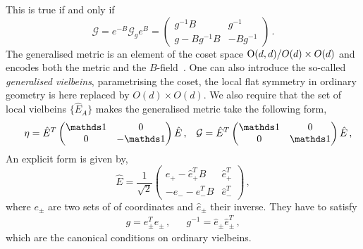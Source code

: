 \documentclass[debug]{phd}
\begin{document}
						This is true if and only if
								\begin{equation}\label{genmet}
									\mathcal{G}= e^{-B} \mathcal{G}_g e^{B} = \begin{pmatrix} g^{-1}B & g^{-1} \\
																g - B g^{-1} B & -B g^{-1} \end{pmatrix}\, .
								\end{equation}
						The generalised metric is an element of the coset space $\mathrm{O}(d,d)/O(d) \times O(d)$ and encodes both the metric and the $B$-field~\cite{petrini3}.
						One can also introduce the so-called \emph{generalised vielbeins}, parametrising the coset, the local flat symmetry in ordinary geometry is here replaced by $O(d) \times O(d)$.
						We also require that the set of local vielbeins $\{\hat{E}_A\}$ makes the generalised metric take the following form,
								\begin{align}
									& & \eta = \hat{E}^{T} \begin{pmatrix}
										\id & 0 \\
										0 & -\id
									\end{pmatrix} \hat{E} \, , & & \mathcal{G} = \hat{E}^{T} \begin{pmatrix}
										\id & 0 \\
										0 & \id
									\end{pmatrix} \hat{E} \, ,
								\end{align}
						An explicit form is given by,
								\begin{equation}
									\hat{E} = \frac{1}{\sqrt{2}} \begin{pmatrix}
									e_+ - \hat{e}_+^T B & \hat{e}_+^T \\
									- e_{-} - \hat{e}_{-}^T B & \hat{e}_{-}^T 
									\end{pmatrix}\, ,
								\end{equation}
						where $e_{\pm}$ are two sets of of coordinates and $\hat{e}_\pm$ their inverse.
						They have to satisfy
								\begin{align}
									&& g = e_{\pm}^T e_{\pm}\, , && g^{-1} = \hat{e}_{\pm} \hat{e}_{\pm}^T \, , & &
								\end{align}
						which are the canonical conditions on ordinary vielbeins.
\end{document}
